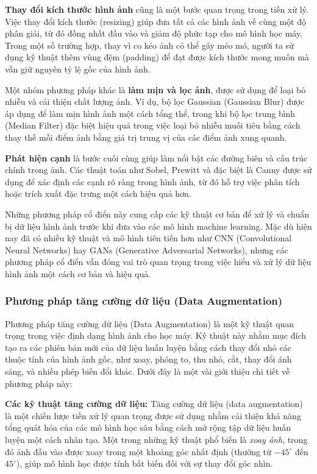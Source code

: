 \documentclass[12pt]{report}
\begin{document}
\textbf{Thay đổi kích thước hình ảnh} cũng là một bước quan trọng trong tiền xử lý. Việc thay đổi kích thước (resizing) giúp đưa tất cả các hình ảnh về cùng một độ phân giải, từ đó đồng nhất đầu vào và giảm độ phức tạp cho mô hình học máy. Trong một số trường hợp, thay vì co kéo ảnh có thể gây méo mó, người ta sử dụng kỹ thuật thêm vùng đệm (padding) để đạt được kích thước mong muốn mà vẫn giữ nguyên tỷ lệ gốc của hình ảnh.

Một nhóm phương pháp khác là \textbf{làm mịn và lọc ảnh}, được sử dụng để loại bỏ nhiễu và cải thiện chất lượng ảnh. Ví dụ, bộ lọc Gaussian (Gaussian Blur) được áp dụng để làm mịn hình ảnh một cách tổng thể, trong khi bộ lọc trung bình (Median Filter) đặc biệt hiệu quả trong việc loại bỏ nhiễu muối tiêu bằng cách thay thế mỗi điểm ảnh bằng giá trị trung vị của các điểm ảnh xung quanh.

\textbf{Phát hiện cạnh} là bước cuối cùng giúp làm nổi bật các đường biên và cấu trúc chính trong ảnh. Các thuật toán như Sobel, Prewitt và đặc biệt là Canny được sử dụng để xác định các cạnh rõ ràng trong hình ảnh, từ đó hỗ trợ việc phân tích hoặc trích xuất đặc trưng một cách hiệu quả hơn.


Những phương pháp cổ điển này cung cấp các kỹ thuật cơ bản để xử lý và chuẩn bị dữ liệu hình ảnh trước khi đưa vào các mô hình machine learning. Mặc dù hiện nay đã có nhiều kỹ thuật và mô hình tiên tiến hơn như CNN (Convolutional Neural Networks) hay GANs (Generative Adversarial Networks), nhưng các phương pháp cổ điển vẫn đóng vai trò quan trọng trong việc hiểu và xử lý dữ liệu hình ảnh một cách cơ bản và hiệu quả.

\subsubsection{Phương pháp tăng cường dữ liệu (Data Augmentation)}

Phương pháp tăng cường dữ liệu (Data Augmentation) là một kỹ thuật quan trọng trong việc định dạng hình ảnh cho học máy. Kỹ thuật này nhằm mục đích tạo ra các phiên bản mới của dữ liệu huấn luyện bằng cách thay đổi nhỏ các thuộc tính của hình ảnh gốc, như xoay, phóng to, thu nhỏ, cắt, thay đổi ánh sáng, và nhiều phép biến đổi khác. Dưới đây là một vài giới thiệu chi tiết về phương pháp này:

\textbf{Các kỹ thuật tăng cường dữ liệu:} Tăng cường dữ liệu (data augmentation) là một chiến lược tiền xử lý quan trọng được sử dụng nhằm cải thiện khả năng tổng quát hóa của các mô hình học sâu bằng cách mở rộng tập dữ liệu huấn luyện một cách nhân tạo. Một trong những kỹ thuật phổ biến là \textit{xoay ảnh}, trong đó ảnh đầu vào được xoay trong một khoảng góc nhất định (thường từ $-45^\circ$ đến $45^\circ$), giúp mô hình học được tính bất biến đối với sự thay đổi góc nhìn. 
\end{document}

